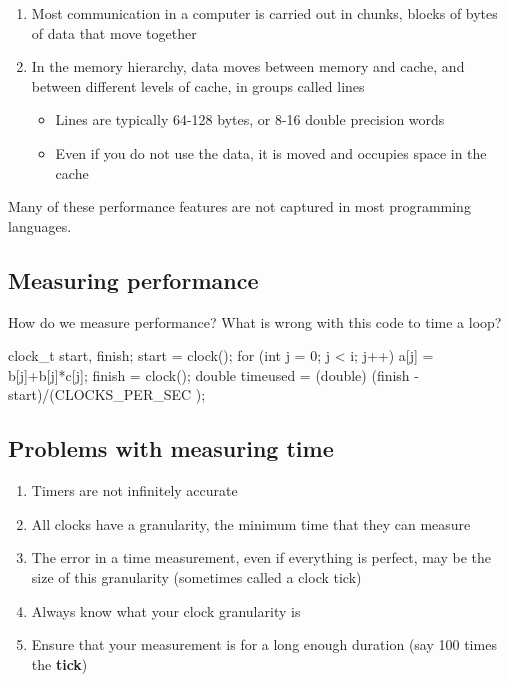 \documentclass[%
oneside,                 %
final,                   %
10pt]{article}
\begin{document}
\begin{enumerate}
\item Most communication in a computer is carried out in chunks, blocks of bytes of data that move together

\item In the memory hierarchy, data moves between memory and cache, and between different levels of cache, in groups called lines
\begin{itemize}

 \item Lines are typically 64-128 bytes, or 8-16 double precision words

 \item Even if you do not use the data, it is moved and occupies space in the cache
\end{itemize}

\noindent
\end{enumerate}

\noindent
Many of these  performance features are not captured in most programming languages.

\subsection{Measuring performance}

How do we measure performance? What is wrong with this code to time a loop?








\bdat
  clock_t start, finish;
  start = clock();
  for (int j = 0; j < i; j++) {
    a[j] = b[j]+b[j]*c[j];
  }
  finish = clock();
  double timeused = (double) (finish - start)/(CLOCKS_PER_SEC );

\edat


\subsection{Problems with measuring time}
\begin{enumerate}
\item Timers are not infinitely accurate

\item All clocks have a granularity, the minimum time that they can measure

\item The error in a time measurement, even if everything is perfect, may be the size of this granularity (sometimes called a clock tick)

\item Always know what your clock granularity is

\item Ensure that your measurement is for a long enough duration (say 100 times the \textbf{tick})
\end{enumerate}
\end{document}
